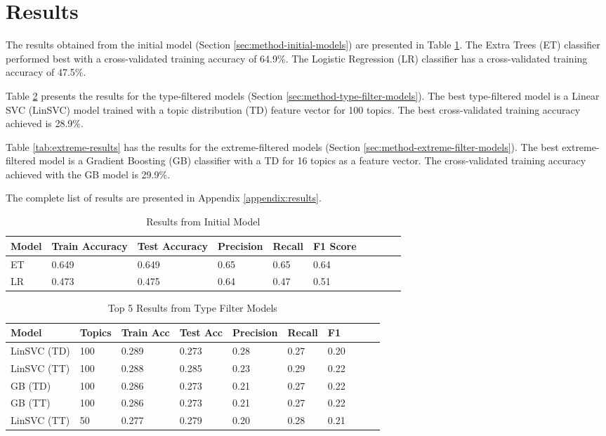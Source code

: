 \section{Results}

The results obtained from the initial model (Section \ref{sec:method-initial-models}) are presented in Table \ref{tab:initial-results}.
The Extra Trees (ET) classifier performed best with a cross-validated training accuracy of 64.9\%.
The Logistic Regression (LR) classifier has a cross-validated training accuracy of 47.5\%.

Table \ref{tab:filter-results} presents the results for the type-filtered models (Section \ref{sec:method-type-filter-models}).
The best type-filtered model is a Linear SVC (LinSVC) model trained with a topic distribution (TD) feature vector for 100 topics.
The best cross-validated training accuracy achieved is 28.9\%.

Table \ref{tab:extreme-results} has the results for the extreme-filtered models (Section \ref{sec:method-extreme-filter-models}).
The best extreme-filtered model is a Gradient Boosting (GB) classifier with a TD for 16 topics as a feature vector.
The cross-validated training accuracy achieved with the GB model is 29.9\%.

The complete list of results are presented in Appendix \ref{appendix:results}.
\begin{table}[!t]
    \centering
    \caption{Results from Initial Model}
    \label{tab:initial-results}
    \begin{tabular}{@{}llllllllll@{}}
    \toprule
    \rowcolor[HTML]{FFFFFF} 
    \textbf{Model} & \textbf{Train Accuracy} & \textbf{Test Accuracy} & \textbf{Precision} & \textbf{Recall} & \textbf{F1 Score} \\ \midrule
    ET & 0.649 & 0.649 & 0.65 & 0.65 & 0.64 \\
    LR & 0.473 & 0.475 & 0.64 & 0.47 & 0.51
\end{tabular}
\end{table}

\begin{table}[!t]
    \centering
    \caption{Top 5 Results from Type Filter Models}
    \label{tab:filter-results}
    \begin{tabular}{@{}llllllllll@{}}
    \toprule
    \rowcolor[HTML]{FFFFFF} 
    \textbf{Model} & \textbf{Topics} & \textbf{Train Acc} & \textbf{Test Acc} & \textbf{Precision} & \textbf{Recall} & \textbf{F1} \\ \midrule
    LinSVC (TD) & 100 & 0.289 & 0.273 & 0.28 & 0.27 & 0.20 \\
    LinSVC (TT) & 100 & 0.288 & 0.285 &	0.23 & 0.29	& 0.22 \\
    GB (TD)     & 100 & 0.286 &	0.273 &	0.21 & 0.27	& 0.22 \\
    GB (TT)     & 100 & 0.286 & 0.273 &	0.21 & 0.27 & 0.22 \\
    LinSVC (TT) & 50  & 0.277 & 0.279 & 0.20 & 0.28 & 0.21
\end{tabular}
\end{table}

